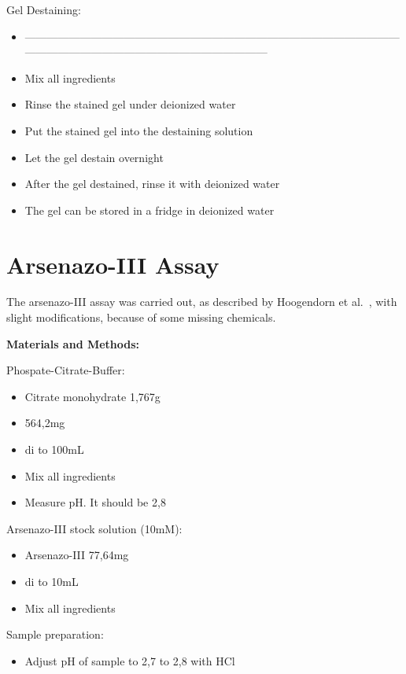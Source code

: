 Gel Destaining:
\begin{itemize}
    \item ------------------------------------------------------------------------------------------------------------------------------------------------------------------------
    \item Mix all ingredients
    \item Rinse the stained gel under deionized water
    \item Put the stained gel into the destaining solution
    \item Let the gel destain overnight
    \item After the gel destained, rinse it with deionized water
    \item The gel can be stored in a fridge in deionized water
\end{itemize}


\section{Arsenazo-III Assay\authorA}

The arsenazo-III assay was carried out, as described by Hoogendorn et al.~\cite{arsenazo3assay}, with slight modifications, because of some missing chemicals.

\textbf{Materials and Methods:}

Phospate-Citrate-Buffer:
\begin{itemize}
    \item Citrate monohydrate 1,767g
    \item {} 564,2mg
    \item di to 100mL
    \item Mix all ingredients
    \item Measure pH. It should be 2,8
\end{itemize}

Arsenazo-III stock solution (10mM):
\begin{itemize}
    \item Arsenazo-III 77,64mg
    \item di to 10mL
    \item Mix all ingredients
\end{itemize}

Sample preparation:
\begin{itemize}
    \item Adjust pH of sample to 2,7 to 2,8 with HCl
\end{itemize}

